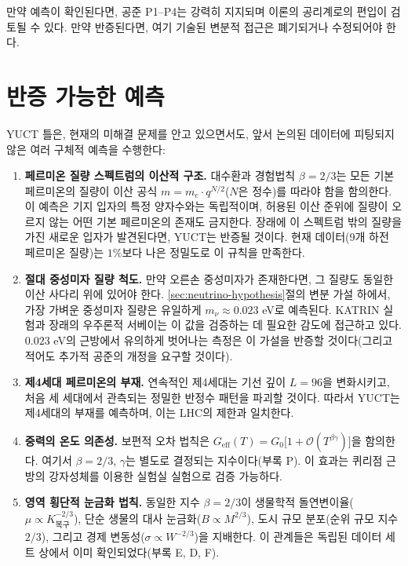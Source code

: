 \documentclass[12pt,a4paper]{article}
\begin{document}
	만약 예측이 확인된다면, 공준 P1--P4는 강력히 지지되며 이론의 공리계로의 편입이 검토될 수 있다. 만약 반증된다면, 여기 기술된 변분적 접근은 폐기되거나 수정되어야 한다.
	
	\section{반증 가능한 예측}
	
	YUCT 틀은, 현재의 미해결 문제를 안고 있으면서도, 앞서 논의된 데이터에 피팅되지 않은 여러 구체적 예측을 수행한다:
	
	\begin{enumerate}[label=(\arabic*)]
		\item \textbf{페르미온 질량 스펙트럼의 이산적 구조.} 대수환과 경험법칙 \(\beta = 2/3\)는 모든 기본 페르미온의 질량이 이산 공식 \(m = m_e \cdot q^{N/2}\)(\(N\)은 정수)를 따라야 함을 함의한다. 이 예측은 기지 입자의 특정 양자수와는 독립적이며, 허용된 이산 준위에 질량이 오르지 않는 어떤 기본 페르미온의 존재도 금지한다. 장래에 이 스펙트럼 밖의 질량을 가진 새로운 입자가 발견된다면, YUCT는 반증될 것이다. 현재 데이터(9개 하전 페르미온 질량)는 \(1\%\)보다 나은 정밀도로 이 규칙을 만족한다.
		\item \textbf{절대 중성미자 질량 척도.} 만약 오른손 중성미자가 존재한다면, 그 질량도 동일한 이산 사다리 위에 있어야 한다. \ref{sec:neutrino-hypothesis}절의 변분 가설 하에서, 가장 가벼운 중성미자 질량은 유일하게 \(m_{\nu} \approx 0.023\) eV로 예측된다. KATRIN 실험과 장래의 우주론적 서베이는 이 값을 검증하는 데 필요한 감도에 접근하고 있다. \(0.023\) eV의 근방에서 유의하게 벗어나는 측정은 이 가설을 반증할 것이다(그리고 적어도 추가적 공준의 개정을 요구할 것이다).
		\item \textbf{제4세대 페르미온의 부재.} 연속적인 제4세대는 기선 깊이 \(L = 96\)을 변화시키고, 처음 세 세대에서 관측되는 정밀한 반정수 패턴을 파괴할 것이다. 따라서 YUCT는 제4세대의 부재를 예측하며, 이는 LHC의 제한과 일치한다.
		\item \textbf{중력의 온도 의존성.} 보편적 오차 법칙은 \(G_{\mathrm{eff}}(T) = G_0\bigl[1 + \mathcal{O}(T^{\beta\gamma})\bigr]\)을 함의한다. 여기서 \(\beta = 2/3\), \(\gamma\)는 별도로 결정되는 지수이다(부록 P). 이 효과는 퀴리점 근방의 강자성체를 이용한 실험실 실험으로 검증 가능하다.
		\item \textbf{영역 횡단적 눈금화 법칙.} 동일한 지수 \(\beta = 2/3\)이 생물학적 돌연변이율(\(\mu \propto K_{\text{복구}}^{-2/3}\)), 단순 생물의 대사 눈금화(\(B \propto M^{2/3}\)), 도시 규모 분포(순위 규모 지수 \(2/3\)), 그리고 경제 변동성(\(\sigma \propto W^{-2/3}\))을 지배한다. 이 관계들은 독립된 데이터 세트 상에서 이미 확인되었다(부록 E, D, F).
	\end{enumerate}
	
\end{document}
